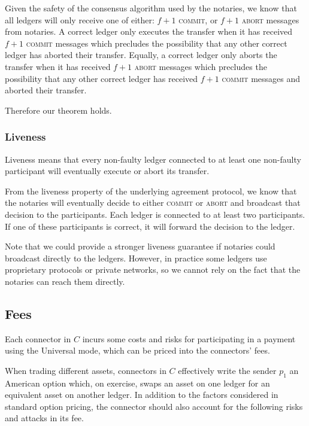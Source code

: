 \documentclass[letterpaper,twocolumn,10pt]{article}
\begin{document}
Given the safety of the consensus algorithm used by the notaries, 
we know that all ledgers will only receive one of either: $f + 1$ \textsc{commit}, or $f + 1$ \textsc{abort} messages from notaries. A correct ledger only executes the transfer when it has received $f + 1$ \textsc{commit} messages which precludes the possibility that any other correct ledger has aborted their transfer. Equally, a correct ledger only aborts the transfer when it has received $f + 1$ \textsc{abort} messages which precludes the possibility that any other correct ledger has received $f + 1$ \textsc{commit} messages and aborted their transfer.

Therefore our theorem holds.

\subsubsection{Liveness}

Liveness means that every non-faulty ledger connected to at least one non-faulty participant will eventually execute or abort its transfer.

From the liveness property of the underlying agreement protocol, we know that the notaries will eventually decide to either \textsc{commit} or \textsc{abort} and broadcast that decision to the participants. Each ledger is connected to at least two participants. If one of these participants is correct, it will forward the decision to the ledger.

Note that we could provide a stronger liveness guarantee if notaries could broadcast directly to the ledgers. However, in practice some ledgers use proprietary protocols or private networks, so we cannot rely on the fact that the notaries can reach them directly.



\subsection{Fees}
\label{subsec:fees}

Each connector in $C$ incurs some costs and risks for participating in a payment using the Universal mode, which can be priced into the connectors' fees.

When trading different assets, connectors in $C$ effectively write the sender $p_1$ an American option \cite{black1973pricing}\cite{brennan1977valuation}
which, on exercise, swaps an asset on one ledger for an equivalent asset on another ledger.
In addition to the factors considered in standard option pricing, the connector should also account for the following risks and attacks in its fee.
\end{document}

